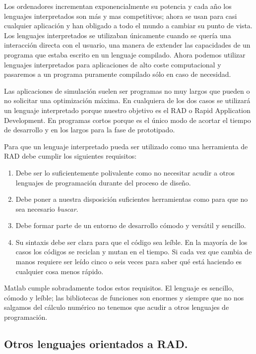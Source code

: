 Los ordenadores incrementan exponencialmente su potencia y cada año
los lenguajes interpretados son más y mas competitivos; ahora se usan
para casi cualquier aplicación y han obligado a todo el mundo a
cambiar su punto de vista. Los lenguajes interpretados se utilizaban
únicamente cuando se quería una interacción directa con el usuario,
una manera de extender las capacidades de un programa que estaba
escrito en un lenguaje compilado. Ahora podemos utilizar lenguajes
interpretados para aplicaciones de alto coste computacional y
pasaremos a un programa puramente compilado sólo en caso de necesidad.

Las aplicaciones de simulación suelen ser programas no muy largos que
pueden o no solicitar una optimización máxima. En cualquiera de los
dos casos se utilizará un lenguaje interpretado porque nuestro
objetivo es el RAD o Rapid Application Development. En programas
cortos porque es el único modo de acortar el tiempo de desarrollo y en
los largos para la fase de prototipado.

Para que un lenguaje interpretado pueda ser utilizado como una
herramienta de RAD debe cumplir los siguientes requisitos:

\begin{enumerate}
\item Debe ser lo suficientemente polivalente como no necesitar acudir
  a otros lenguajes de programación durante del proceso de diseño.
\item Debe poner a nuestra disposición suficientes herramientas como
  para que no sea necesario \emph{buscar}.
\item Debe formar parte de un entorno de desarrollo cómodo y versátil
  y sencillo.
\item Su sintaxis debe ser clara para que el código sea leíble. En la
  mayoría de los casos los códigos se reciclan y mutan en el tiempo.
  Si cada vez que cambia de manos requiere ser leído cinco o seis
  veces para saber qué está haciendo es cualquier cosa menos rápido.
\end{enumerate}
Matlab cumple sobradamente todos estos requisitos. El lenguaje es
sencillo, cómodo y leíble; las bibliotecas de funciones son enormes y
siempre que no nos salgamos del cálculo numérico no tenemos que acudir
a otros lenguajes de programación.


\subsection{Otros lenguajes orientados a RAD.}


